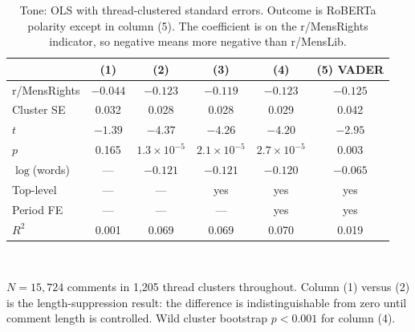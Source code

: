 \documentclass[11pt,a4paper]{article}
\begin{document}
\begin{table}[h]
\centering\small
\caption{Tone: OLS with thread-clustered standard errors. Outcome is RoBERTa polarity except in
column (5). The coefficient is on the r/MensRights indicator, so negative means more negative than
r/MensLib.}
\begin{tabular}{lccccc}
\toprule
& (1) & (2) & (3) & (4) & (5) VADER \\
\midrule
r/MensRights    & $-0.044$ & $-0.123$ & $-0.119$ & $-0.123$ & $-0.125$ \\
Cluster SE      & 0.032 & 0.028 & 0.028 & 0.029 & 0.042 \\
$t$             & $-1.39$ & $-4.37$ & $-4.26$ & $-4.20$ & $-2.95$ \\
$p$             & 0.165 & $1.3\times10^{-5}$ & $2.1\times10^{-5}$ & $2.7\times10^{-5}$ & 0.003 \\
$\log$(words)   & --- & $-0.121$ & $-0.121$ & $-0.120$ & $-0.065$ \\
Top-level       & --- & --- & yes & yes & yes \\
Period FE       & --- & --- & --- & yes & yes \\
$R^2$           & 0.001 & 0.069 & 0.069 & 0.070 & 0.019 \\
\bottomrule
\end{tabular}
\\[0.4em]
\begin{minipage}{0.92\linewidth}\footnotesize
$N = 15{,}724$ comments in 1{,}205 thread clusters throughout. Column (1) versus (2) is the
length-suppression result: the difference is indistinguishable from zero until comment length is
controlled. Wild cluster bootstrap $p < 0.001$ for column (4).
\end{minipage}
\end{table}
\end{document}
